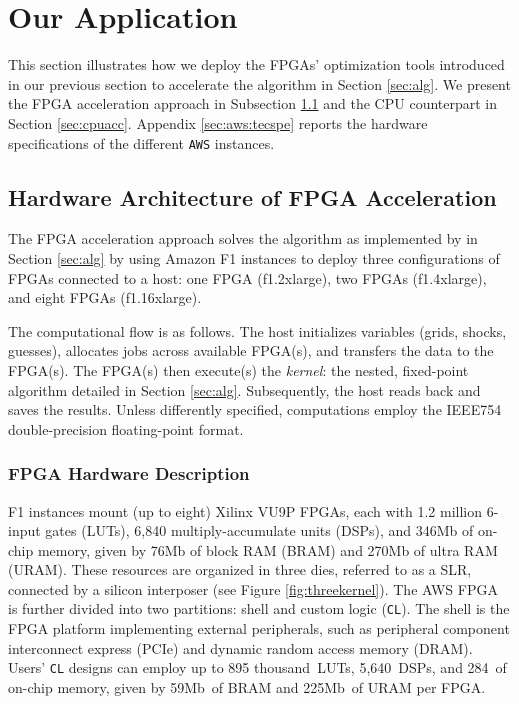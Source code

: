 \documentclass[12pt,american]{article}
\makeatletter
\newcommand{\awsinstfI}{f1.2xlarge\@\xspace}
\newcommand{\awsinstfII}{f1.4xlarge\@\xspace}
\newcommand{\awsinstfIII}{f1.16xlarge\@\xspace}
\newcommand{\CLdesignLUT}{895 thousand}
\newcommand{\CLdesignDSP}{5,640}
\newcommand{\CLdesignonchipmemory}{284}
\newcommand{\CLdesignBRAMMemory}{59Mb}
\newcommand{\CLdesignURAMMemory}{225Mb}
\makeatother
\begin{document}
\section{Our Application}\label{sec:accschhar}

This section illustrates how we deploy the FPGAs' optimization tools introduced in our previous section to accelerate the \citet{KrusellSmith1998} algorithm in Section \ref{sec:alg}. We present the FPGA acceleration approach in Subsection \ref{sec:fpgaacc} and the CPU counterpart in Section \ref{sec:cpuacc}. Appendix \ref{sec:aws:tecspe} reports the hardware specifications of the different \texttt{AWS} instances.

\subsection{Hardware Architecture of FPGA Acceleration}\label{sec:fpgaacc}

The FPGA acceleration approach solves the \citet{KrusellSmith1998} algorithm as implemented by \cite{MaliarMaliarValli2010} in Section \ref{sec:alg} by using Amazon F1 instances to deploy three configurations of FPGAs connected to a host: one FPGA (\awsinstfI), two FPGAs (\awsinstfII), and eight FPGAs (\awsinstfIII). 

The computational flow is as follows. The host initializes variables (grids, shocks, guesses), allocates jobs across available FPGA(s), and transfers the data to the FPGA(s). The FPGA(s) then execute(s) the \textit{kernel}: the nested, fixed-point algorithm detailed in Section \ref{sec:alg}. Subsequently, the host reads back and saves the results. Unless differently specified, computations employ the IEEE754 double-precision floating-point format. 

\subsubsection{FPGA Hardware Description}\label{sec:FPGAhardes}

F1 instances mount (up to eight) Xilinx VU9P FPGAs, each with 1.2 million 6-input gates (LUTs), 6,840 multiply-accumulate units (DSPs), and 346Mb of on-chip memory, given by 76Mb of block RAM (BRAM) and 270Mb of ultra RAM (URAM). These resources are organized in three dies, referred to as a SLR, connected by a silicon interposer (see Figure \ref{fig:threekernel}). The AWS FPGA is further divided into two partitions: shell and custom logic (\texttt{CL}). The shell is the FPGA platform implementing external peripherals, such as peripheral component interconnect express (PCIe) and dynamic random access memory (DRAM). Users' \texttt{CL} designs can employ up to \CLdesignLUT\, LUTs, \CLdesignDSP\, DSPs, and \CLdesignonchipmemory\, of on-chip memory, given by \CLdesignBRAMMemory\, of BRAM and \CLdesignURAMMemory\, of URAM per FPGA.
\end{document}
